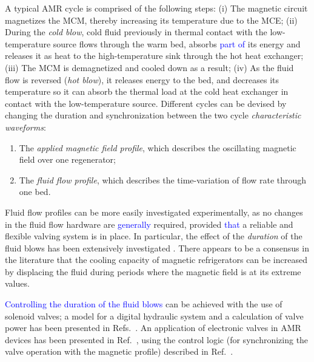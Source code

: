\documentclass[referee]{svjour3}
\begin{document}

A typical AMR cycle is comprised of the following steps: (i) The magnetic circuit magnetizes the MCM, thereby increasing its temperature due to the MCE; (ii) During the \emph{cold blow}, cold fluid previously in thermal contact with the low-temperature source flows through the warm bed, absorbs \textcolor{blue}{part of} its energy and releases it as heat to the high-temperature sink through the hot heat exchanger; (iii) The MCM is demagnetized and cooled down as a result; (iv) As the fluid flow is reversed (\emph{hot blow}), it releases energy to the bed, and decreases its temperature so it can absorb the thermal load at the cold heat exchanger in contact with the low-temperature source. Different cycles can be devised by changing the duration and synchronization  between the two cycle \emph{characteristic waveforms}:

\begin{enumerate}
\item The \emph{applied magnetic field profile}, which describes the oscillating magnetic field over one regenerator;
\item The \emph{fluid flow profile}, which describes the time-variation of flow rate through one bed.
\end{enumerate}

Fluid flow profiles can be more easily investigated experimentally, as no changes in the fluid flow hardware are \textcolor{blue}{generally} required, provided \textcolor{blue}{that} a reliable and flexible valving system is in place. In particular, the effect of the \emph{duration} of the fluid blows has been extensively investigated \cite{bib:teyber17_exper,bib:nakashima18-influen-exp,FORTKAMP2018}. There appears to be a consensus in the literature that the cooling capacity of magnetic refrigerators can be increased by displacing the fluid during periods where the magnetic field is at its extreme values. 

\textcolor{blue}{Controlling the duration of the fluid blows} can be achieved with the use of solenoid valves; a model for a digital hydraulic system and a calculation of valve power has been presented in Refs.~\cite{bib:cardoso16_trans, bib:cardoso18}.  An application of  electronic valves in AMR devices has been presented in Ref.~\cite{bib:nakashima18-perfor-asses-solen-valves-flow}, using the control logic (for synchronizing the valve operation with the magnetic profile) described in Ref.~\cite{bib:hoffmann17-actuat}.
\end{document}
